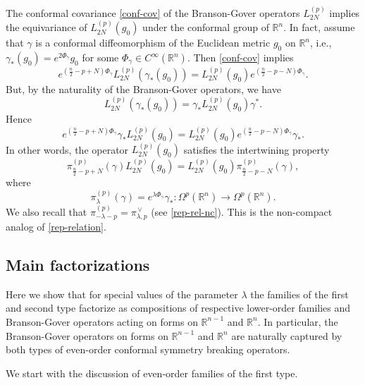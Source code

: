 \documentclass[a4paper,12pt,reqno]{amsart}
\numberwithin{theorem}{subsection}
\numberwithin{equation}{section}
\begin{document}
The conformal covariance \eqref{conf-cov} of the Branson-Gover operators
$L_{2N}^{(p)}$ implies the equivariance of $L_{2N}^{(p)}(g_0)$ under the
conformal group of ${\mathbb{R}}^{n}$. In fact, assume that $\gamma$ is a conformal
diffeomorphism of the Euclidean metric $g_0$ on ${\mathbb{R}}^n$, i.e., $\gamma_*(g_0) =
e^{2\Phi_\gamma} g_0$ for some $\Phi_\gamma \in C^\infty({\mathbb{R}}^n)$. Then
\eqref{conf-cov} implies
$$
   e^{(\frac{n}{2}-p+N) \Phi_\gamma} L_{2N}^{(p)} (\gamma_*(g_0)) =
   L_{2N}^{(p)}(g_0) e^{(\frac{n}{2}-p-N)\Phi_\gamma}.
$$
But, by the naturality of the Branson-Gover operators, we have
$$
L_{2N}^{(p)} (\gamma_*(g_0)) = \gamma_* L_{2N}^{(p)}(g_0) \gamma^*.
$$
Hence
$$
   e^{(\frac{n}{2}-p+N) \Phi_\gamma} \gamma_* L_{2N}^{(p)}(g_0) =
   L_{2N}^{(p)}(g_0) e^{(\frac{n}{2}-p-N)\Phi_\gamma} \gamma_*.
$$
In other words, the operator $L_{2N}^{(p)}(g_0)$ satisfies the intertwining
property
\begin{equation}\label{flat-intertwining}
   \pi_{\frac{n}{2}-p+N}^{(p)}(\gamma) L_{2N}^{(p)}(g_0) = L_{2N}^{(p)}(g_0)
   \pi_{\frac{n}{2}-p-N}^{(p)}(\gamma),
\end{equation}
where
\begin{equation*}
   \pi_\lambda^{(p)}(\gamma) = e^{\lambda \Phi_\gamma} \gamma_*: \Omega^p ({\mathbb{R}}^n) \to \Omega^p({\mathbb{R}}^n).
\end{equation*}
We also recall that $\pi_{-\lambda-p}^{(p)} = \pi_{\lambda,p}^{{\,\vee}}$ (see
\eqref{rep-rel-nc}). This is the non-compact analog of \eqref{rep-relation}.

\subsection{Main factorizations}\label{factor1}

Here we show that for special values of the parameter $\lambda$ the families of
the first and second type factorize as compositions of respective lower-order
families and Branson-Gover operators acting on forms on ${\mathbb{R}}^{n-1}$ and
${\mathbb{R}}^{n}$. In particular, the Branson-Gover operators on forms on ${\mathbb{R}}^{n-1}$ and
${\mathbb{R}}^{n}$ are naturally captured by both types of even-order conformal symmetry
breaking operators.

We start with the discussion of even-order families of the first type.
\end{document}
